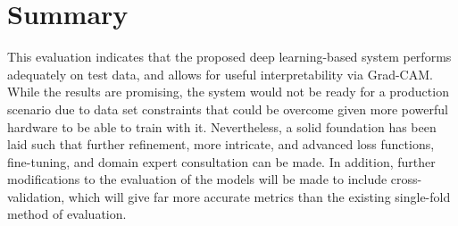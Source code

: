 \documentclass[../main]{subfiles}
\begin{document}
\section{Summary}
\label{sec:summary}
This evaluation indicates that the proposed deep learning-based system performs adequately on test data, and allows for useful interpretability via Grad-CAM. While the results are promising, the system would not be ready for a production scenario due to data set constraints that could be overcome given more powerful hardware to be able to train with it. Nevertheless, a solid foundation has been laid such that further refinement, more intricate, and advanced loss functions, fine-tuning, and domain expert consultation can be made. In addition, further modifications to the evaluation of the models will be made to include cross-validation, which will give far more accurate metrics than the existing single-fold method of evaluation.
\end{document}
